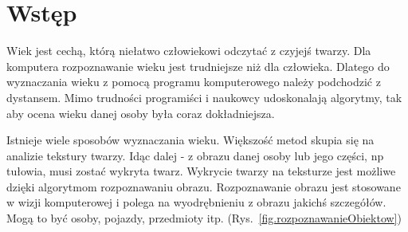 \documentclass[a4paper,twoside,12pt]{book}
\newcounter{stronyPozaNumeracja}
\begin{document}
    \vfill




    \cleardoublepage


    \pagestyle{tylkoNumeryStron}
    \tableofcontents

    \setcounter{stronyPozaNumeracja}{\value{page}}
    \mainmatter
    \pagestyle{NumeryStronNazwyRozdzialow}


    \chapter{Wstęp}\label{ch:wstęp}

    Wiek jest cechą, którą niełatwo człowiekowi odczytać z czyjejś twarzy.
    Dla komputera rozpoznawanie wieku jest
    trudniejsze niż dla człowieka.
    Dlatego do wyznaczania wieku z pomocą programu komputerowego należy podchodzić z dystansem.
    Mimo trudności programiści
    i naukowcy udoskonalają algorytmy,
    tak aby ocena wieku danej osoby była coraz dokładniejsza.

    Istnieje wiele sposobów wyznaczania wieku.
    Większość metod skupia się na analizie tekstury twarzy.
    Idąc dalej - z obrazu danej osoby lub jego części, np tułowia,
    musi zostać wykryta twarz.
    Wykrycie twarzy na teksturze jest możliwe dzięki algorytmom rozpoznawaniu obrazu.
    Rozpoznawanie obrazu jest stosowane w wizji komputerowej i polega na wyodrębnieniu z obrazu jakichś szczegółów.
    Mogą
    to być osoby, pojazdy, przedmioty itp. (Rys.~\ref{fig.rozpoznawanieObiektow})
\end{document}
